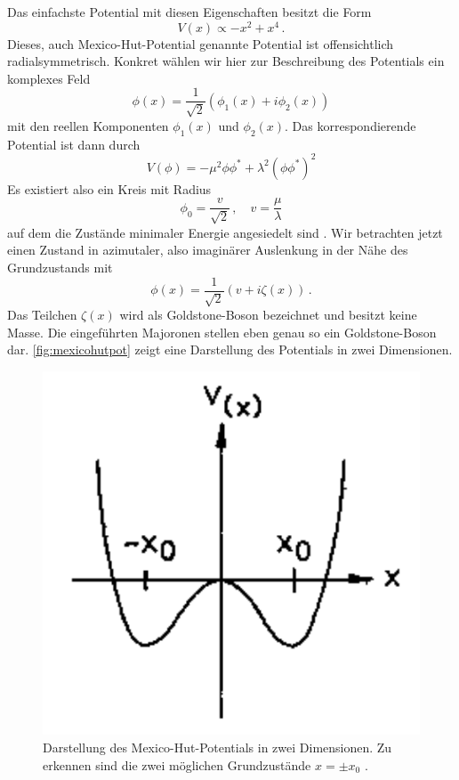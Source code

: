 Das einfachste Potential mit diesen Eigenschaften besitzt die Form
\begin{equation*}
    V(x) \propto -x^2 + x^4 \,.
\end{equation*}
Dieses, auch Mexico-Hut-Potential genannte Potential ist offensichtlich radialsymmetrisch.
Konkret wählen wir hier zur Beschreibung des Potentials ein komplexes Feld
\begin{equation*}
    \phi(x) = \frac{1}{\sqrt{2}} (\phi_1(x) + i \phi_2(x))
\end{equation*}
mit den reellen Komponenten $\phi_1(x)$ und $\phi_2(x)$.
Das korrespondierende Potential ist dann durch
\begin{equation}
    V(\phi) = -\mu^2 \phi\phi^* + \lambda^2 (\phi\phi^*)^2
\end{equation}
Es existiert also ein Kreis mit Radius
\begin{equation*}
    \phi_0 = \frac{v}{\sqrt{2}} \,, \quad v = \frac{\mu}{\lambda}
\end{equation*}
auf dem die Zustände minimaler Energie angesiedelt sind \cite{schmüser}.
Wir betrachten jetzt einen Zustand in azimutaler, also imaginärer Auslenkung in der Nähe des Grundzustands mit
\begin{equation*}
    \phi(x) = \frac{1}{\sqrt{2}} (v + i \zeta(x)) \,.
\end{equation*}
Das Teilchen $\zeta(x)$ wird als Goldstone-Boson bezeichnet und besitzt keine Masse.
Die eingeführten Majoronen stellen eben genau so ein Goldstone-Boson dar.
\autoref{fig:mexicohutpot} zeigt eine Darstellung des Potentials in zwei Dimensionen.
\begin{figure}[H]
    \centering
    \includegraphics[]{figures/MexicoHutpotential.pdf}
    \caption{Darstellung des Mexico-Hut-Potentials in zwei Dimensionen. Zu erkennen sind die zwei möglichen Grundzustände $x = \pm x_0$ \cite{kleingrot}.}
    \label{fig:mexicohutpot}
\end{figure}
